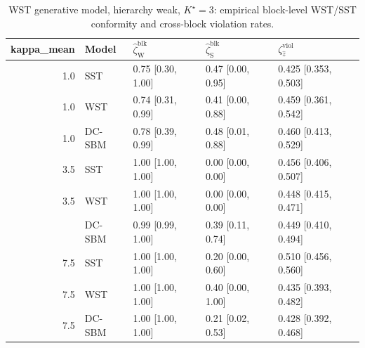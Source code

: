 \begin{table}
\centering
\caption{WST generative model, hierarchy weak, $K^\star=3$: empirical block-level WST/SST conformity and cross-block violation rates.}
\centering
\begin{tabular}[t]{rllll}
\toprule
kappa_mean & Model & $\widehat\zeta_{\mathrm{W}}^{\mathrm{blk}}$ & $\widehat\zeta_{\mathrm{S}}^{\mathrm{blk}}$ & $\zeta^{\mathrm{viol}}_{\hat z}$\\
\midrule
1.0 & SST & 0.75 [0.30, 1.00] & 0.47 [0.00, 0.95] & 0.425 [0.353, 0.503]\\
1.0 & WST & 0.74 [0.31, 0.99] & 0.41 [0.00, 0.88] & 0.459 [0.361, 0.542]\\
1.0 & DC-SBM & 0.78 [0.39, 0.99] & 0.48 [0.01, 0.88] & 0.460 [0.413, 0.529]\\
3.5 & SST & 1.00 [1.00, 1.00] & 0.00 [0.00, 0.00] & 0.456 [0.406, 0.507]\\
3.5 & WST & 1.00 [1.00, 1.00] & 0.00 [0.00, 0.00] & 0.448 [0.415, 0.471]\\
\addlinespace
3.5 & DC-SBM & 0.99 [0.99, 1.00] & 0.39 [0.11, 0.74] & 0.449 [0.410, 0.494]\\
7.5 & SST & 1.00 [1.00, 1.00] & 0.20 [0.00, 0.60] & 0.510 [0.456, 0.560]\\
7.5 & WST & 1.00 [1.00, 1.00] & 0.40 [0.00, 1.00] & 0.435 [0.393, 0.482]\\
7.5 & DC-SBM & 1.00 [1.00, 1.00] & 0.21 [0.02, 0.53] & 0.428 [0.392, 0.468]\\
\bottomrule
\end{tabular}
\end{table}
